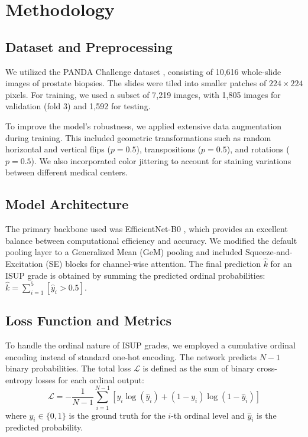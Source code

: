 \documentclass[10pt,conference]{IEEEtran}
\begin{document}
\section{Methodology}
\subsection{Dataset and Preprocessing}
We utilized the PANDA Challenge dataset \cite{panda2020}, consisting of 10,616 whole-slide images of prostate biopsies. The slides were tiled into smaller patches of $224 \times 224$ pixels. For training, we used a subset of 7,219 images, with 1,805 images for validation (fold 3) and 1,592 for testing.

To improve the model's robustness, we applied extensive data augmentation during training. This included geometric transformations such as random horizontal and vertical flips ($p=0.5$), transpositions ($p=0.5$), and rotations ($p=0.5$). We also incorporated color jittering to account for staining variations between different medical centers.

\subsection{Model Architecture}
The primary backbone used was EfficientNet-B0 \cite{tan2019efficientnet}, which provides an excellent balance between computational efficiency and accuracy. We modified the default pooling layer to a Generalized Mean (GeM) pooling and included Squeeze-and-Excitation (SE) blocks \cite{hu2018squeeze} for channel-wise attention. The final prediction $\hat{k}$ for an ISUP grade is obtained by summing the predicted ordinal probabilities: $\hat{k} = \sum_{i=1}^5 [\hat{y}_i > 0.5]$.

\subsection{Loss Function and Metrics}
To handle the ordinal nature of ISUP grades, we employed a cumulative ordinal encoding instead of standard one-hot encoding. The network predicts $N-1$ binary probabilities. The total loss $\mathcal{L}$ is defined as the sum of binary cross-entropy losses for each ordinal output:
\begin{equation}
\mathcal{L} = -\frac{1}{N-1} \sum_{i=1}^{N-1} [y_i \log(\hat{y}_i) + (1-y_i) \log(1-\hat{y}_i)]
\end{equation}
where $y_i \in \{0, 1\}$ is the ground truth for the $i$-th ordinal level and $\hat{y}_i$ is the predicted probability.
\end{document}
